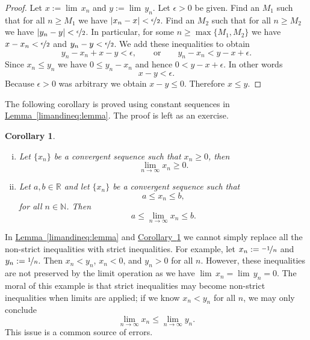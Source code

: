 \documentclass[12pt]{book}
\newcommand{\abs}[1]{\left\lvert {#1} \right\rvert}
\newcommand{\R}{{\mathbb{R}}}
\newcommand{\N}{{\mathbb{N}}}
\theoremstyle{plain}
\newtheorem{cor}[thm]{Corollary}
\theoremstyle{remark}
\theoremstyle{definition}
\theoremstyle{exercise}
\theoremstyle{example}
\newcommand{\lemmaref}[1]{\hyperref[#1]{Lemma~\ref*{#1}}}
\newcommand{\corref}[1]{\hyperref[#1]{Corollary~\ref*{#1}}}
\begin{document}
\begin{proof}
Let $x := \lim\, x_n$ and $y := \lim\, y_n$. 
Let 
$\epsilon > 0$ be given.  Find an $M_1$ such that for all $n \geq M_1$
we have $\abs{x_n-x} < \nicefrac{\epsilon}{2}$.  Find an $M_2$ such that
for all $n \geq M_2$ we have
$\abs{y_n-y} < \nicefrac{\epsilon}{2}$.  In particular,
for some $n \geq \max\{ M_1, M_2 \}$ we have
$x-x_n < \nicefrac{\epsilon}{2}$ and
$y_n-y < \nicefrac{\epsilon}{2}$.  We add these inequalities to
obtain
\begin{equation*}
y_n-x_n+x-y < \epsilon, \qquad \text{or} \qquad
y_n-x_n < y-x+ \epsilon .
\end{equation*}
Since $x_n \leq y_n$ we have
$0 \leq y_n-x_n$ and hence $0 < y-x+ \epsilon$.
In other words
\begin{equation*}
x-y < \epsilon .
\end{equation*}
Because $\epsilon > 0$ was arbitrary we obtain
$x-y \leq 0$.
Therefore $x \leq y$.
\end{proof}

The following corollary is
proved
using constant sequences in
\lemmaref{limandineq:lemma}.  The proof is left as an exercise.

\begin{samepage}
\begin{cor} \label{limandineq:cor}
{\ }
\begin{enumerate}[(i)]
\item Let $\{ x_n \}$ be a convergent sequence such that $x_n \geq 0$,
then
\begin{equation*}
\lim_{n\to\infty} x_n \geq 0.
\end{equation*}
\item
Let $a,b \in \R$ and
let $\{ x_n \}$ be a convergent sequence such that
\begin{equation*}
a \leq x_n \leq b ,
\end{equation*}
for all $n \in \N$.  Then
\begin{equation*}
a \leq \lim_{n\to\infty} x_n \leq b.
\end{equation*}
\end{enumerate}
\end{cor}
\end{samepage}

In \lemmaref{limandineq:lemma} and \corref{limandineq:cor} we cannot simply replace
all the non-strict inequalities with
strict inequalities.  For example,
let $x_n := \nicefrac{-1}{n}$ and $y_n := \nicefrac{1}{n}$.
Then $x_n < y_n$, $x_n < 0$,
and $y_n > 0$ for all $n$.  However, these inequalities are
not preserved by the limit operation as we have
$\lim\, x_n = \lim\, y_n = 0$.
The moral of this example is that strict inequalities may become non-strict
inequalities when limits are applied; if we know
$x_n < y_n$ for all $n$,
we may only conclude 
\begin{equation*}
\lim_{n \to \infty} x_n \leq
\lim_{n \to \infty} y_n .
\end{equation*}
This issue is a common source of errors.
\end{document}

